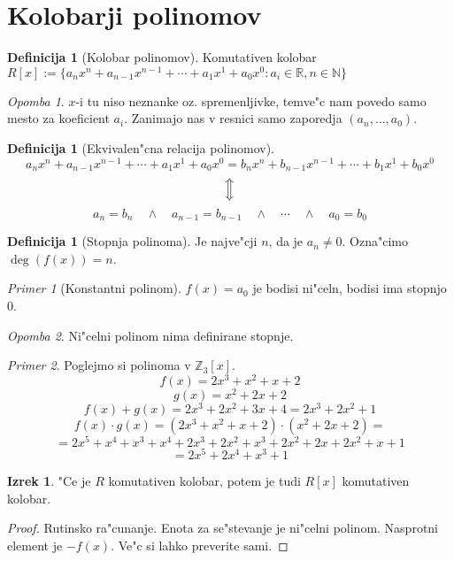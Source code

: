 \documentclass[11pt, a4paper]{article}
\theoremstyle{definition}
\newtheorem{defn}[counter]{Definicija}
\newtheorem{theorem}[counter]{Izrek}
\theoremstyle{remark}
\newtheorem*{ex}{Primer}
\newtheorem*{rem}{Opomba}
\newcommand{\N}{\mathbb{N}}
\newcommand{\Z}{\mathbb{Z}}
\newcommand{\R}{\mathbb{R}}
\begin{document}
	\section{Kolobarji polinomov}
	\begin{defn}[Kolobar polinomov]
		Komutativen kolobar $ R[x] := \lbrace a_nx^n + a_{n-1}x^{n-1} + \cdots + a_1x^1 + a_0x^0: a_i \in \R, n \in \N \rbrace $
	\end{defn}
	\begin{rem}
		$x$-i tu niso neznanke oz. spremenljivke, temve"c nam povedo samo mesto za koeficient $a_i$. Zanimajo nas v resnici samo zaporedja $(a_n, \ldots, a_0)$.
	\end{rem}
	\begin{defn}[Ekvivalen"cna relacija polinomov]
		\[ a_nx^n + a_{n-1}x^{n-1} + \cdots + a_1x^1 + a_0x^0 = b_nx^n + b_{n-1}x^{n-1} + \cdots + b_1x^1 + b_0x^0 \]
		\[ \Big\Updownarrow \]
		\[ a_n = b_n \quad \land \quad a_{n-1} = b_{n-1} \quad \land \quad \cdots \quad \land \quad a_0 = b_0 \]
	\end{defn}
	\begin{defn}[Stopnja polinoma]
		Je najve"cji $n$, da je $a_n \neq 0$. Ozna"cimo $\deg(f(x)) = n$.
	\end{defn}
	\begin{ex}[Konstantni polinom]
		$f(x) = a_0$ je bodisi ni"celn, bodisi ima stopnjo $0$.
	\end{ex}
	\begin{rem}
		Ni"celni polinom nima definirane stopnje.
	\end{rem}
	
	\begin{ex}
		Poglejmo si polinoma v $\Z_3[x]$.
		\[ f(x) = 2x^3 + x^2 + x + 2 \]
		\[ g(x) = x^2 + 2x + 2 \]
		\[ f(x) + g(x) = 2x^3 + 2x^2 + 3x + 4 = 2x^3 + 2x^2 + 1 \]
		\[ f(x) \cdot g(x) = (2x^3 + x^2 + x + 2) \cdot (x^2 + 2x + 2) = \]
		\[ = 2x^5 + x^4 + x^3 + x^4 + 2x^3 + 2x^2 + x^3 + 2x^2 + 2x + 2x^2 + x + 1 \]
		\[ = 2x^5 + 2x^4 + x^3 + 1 \]
	\end{ex}

	\begin{theorem}
		"Ce je $R$ komutativen kolobar, potem je tudi $R[x]$ komutativen kolobar.
	\end{theorem}
	\begin{proof}
		Rutinsko ra"cunanje. Enota za se"stevanje je ni"celni polinom. Nasprotni element je $-f(x)$. Ve"c si lahko preverite sami.
	\end{proof}
\end{document}
